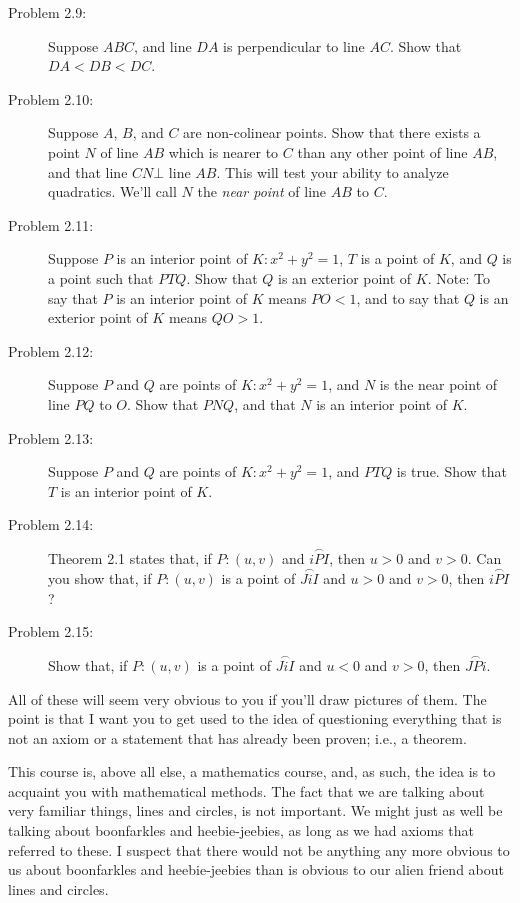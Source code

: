 \documentclass[english]{book}
\newcommand{\arc}[1]{\overset{\frown}{#1} }
\begin{document}
\begin{description}

\item[Problem 2.9:] Suppose $ABC$, and line $DA$ is perpendicular to line $AC$. Show that $DA<DB<DC$.

\item[Problem 2.10:] Suppose $A$, $B$, and $C$ are non-colinear points. Show that there exists a point $N$ of line $AB$ which is nearer to $C$ than any other point of line $AB$, and that line $CN \bot$ line $AB$. This will test your ability to analyze quadratics. We'll call $N$ the \emph{near point} of line $AB$ to $C$.

\item[Problem 2.11:] Suppose $P$ is an interior point of $K:x^{2}+y^{2} = 1$, $T$ is a point of $K$, and $Q$ is a point such that $PTQ$. Show that $Q$ is an exterior point of $K$. Note: To say that $P$ is an interior point of $K$ means $PO<1$, and to say that $Q$ is an exterior point of $K$ means $QO>1$.

\item[Problem 2.12:] Suppose $P$ and $Q$ are points of $K:x^{2}+y^{2} = 1$, and $N$ is the near point of line $PQ$ to $O$. Show that $PNQ$, and that $N$ is an interior point of $K$.

\item[Problem 2.13:] Suppose $P$ and $Q$ are points of $K:x^{2}+y^{2} = 1$, and $PTQ$ is true. Show that $T$ is an interior point of $K$.

\item[Problem 2.14:] Theorem 2.1 states that, if $P:(u,v)$ and $\arc{iPI}$, then $u>0$ and $v>0$. Can you show that, if $P:(u,v)$ is a point of $\arc{JiI}$ and $u>0$ and $v>0$, then $\arc{iPI}$?

\item[Problem 2.15:] Show that, if $P:(u,v)$ is a point of $\arc{JiI}$ and $u<0$ and $v>0$, then $\arc{JPi}$. 

\end{description}

All of these will seem very obvious to you if you'll draw pictures of them. The point is that I want you to get used to the idea of questioning everything that is not an axiom or a statement that has already been proven; i.e., a theorem. 

This course is, above all else, a mathematics course, and, as such, the idea is to acquaint you with mathematical methods. The fact that we are talking about very familiar things, lines and circles, is not important. We might just as well be talking about boonfarkles and heebie-jeebies, as long as we had axioms that referred to these. I suspect that there would not be anything any more obvious to us about boonfarkles and heebie-jeebies than is obvious to our alien friend about lines and circles.
\end{document}
